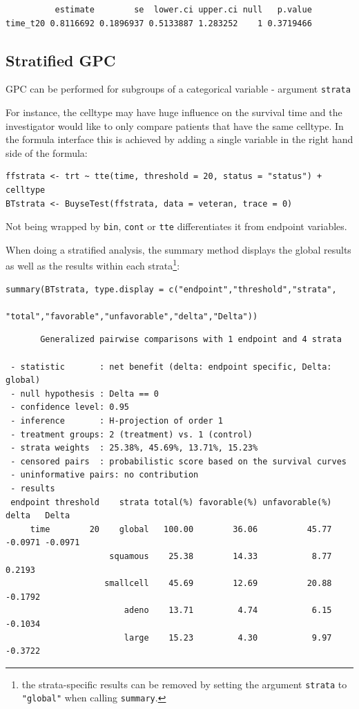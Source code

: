 \documentclass[12pt]{article}
\begin{document}
\begin{verbatim}
          estimate        se  lower.ci upper.ci null   p.value
time_t20 0.8116692 0.1896937 0.5133887 1.283252    1 0.3719466
\end{verbatim}

\subsection{Stratified GPC}
\label{sec:org2ac4f36}

GPC can be performed for subgroups of a categorical variable \hfill -
argument \texttt{strata}

\bigskip

 For instance, the celltype may have huge influence on the survival
time and the investigator would like to only compare patients that
have the same celltype. In the formula interface this is achieved by
adding a single variable in the right hand side of the formula:
\lstset{language=r,label= ,caption= ,captionpos=b,numbers=none}
\begin{lstlisting}
ffstrata <- trt ~ tte(time, threshold = 20, status = "status") + celltype
BTstrata <- BuyseTest(ffstrata, data = veteran, trace = 0)
\end{lstlisting}

Not being wrapped by \texttt{bin}, \texttt{cont} or \texttt{tte} differentiates it from
endpoint variables.

\bigskip

When doing a stratified analysis, the summary method displays the
global results as well as the results within each strata\footnote{the
strata-specific results can be removed by setting the argument
\texttt{strata} to \texttt{"global"} when calling \texttt{summary}.}:
\lstset{language=r,label= ,caption= ,captionpos=b,numbers=none}
\begin{lstlisting}
summary(BTstrata, type.display = c("endpoint","threshold","strata",
                              "total","favorable","unfavorable","delta","Delta"))
\end{lstlisting}

\begin{verbatim}
       Generalized pairwise comparisons with 1 endpoint and 4 strata

 - statistic       : net benefit (delta: endpoint specific, Delta: global) 
 - null hypothesis : Delta == 0 
 - confidence level: 0.95 
 - inference       : H-projection of order 1
 - treatment groups: 2 (treatment) vs. 1 (control) 
 - strata weights  : 25.38%, 45.69%, 13.71%, 15.23% 
 - censored pairs  : probabilistic score based on the survival curves
 - uninformative pairs: no contribution
 - results
 endpoint threshold    strata total(%) favorable(%) unfavorable(%)   delta   Delta
     time        20    global   100.00        36.06          45.77 -0.0971 -0.0971
                     squamous    25.38        14.33           8.77  0.2193        
                    smallcell    45.69        12.69          20.88 -0.1792        
                        adeno    13.71         4.74           6.15 -0.1034        
                        large    15.23         4.30           9.97 -0.3722
\end{verbatim}
\end{document}
